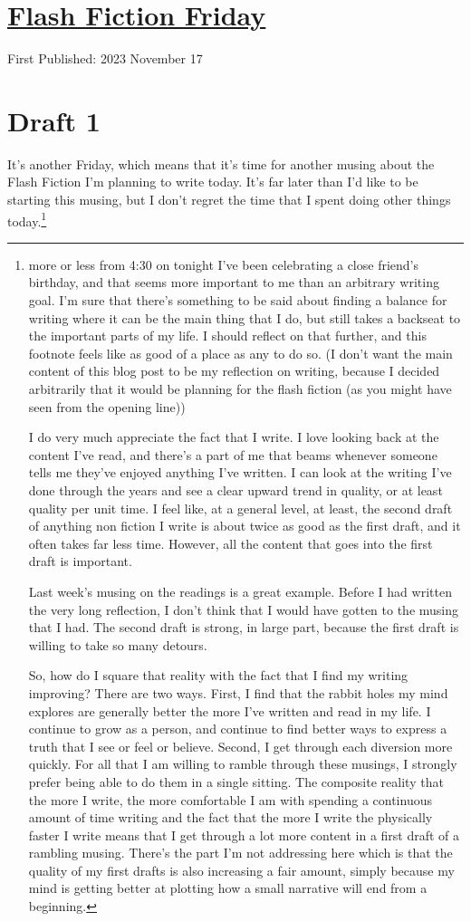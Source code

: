 \documentclass[12pt]{article}[titlepage]
\newcommand{\1}{\={a}}
\newcommand{\2}{\={e}}
\newcommand{\3}{\={\i}}
\newcommand{\4}{\=o}
\newcommand{\5}{\=u}
\newcommand{\6}{\={A}}
\renewcommand{\,}{\textsuperscript{,}}
\begin{document}
\doublespacing
\section{\href{flash-fiction-227.html}{Flash Fiction Friday}}
First Published: 2023 November 17

\section{Draft 1}
It's another Friday, which means that it's time for another musing about the Flash Fiction I'm planning to write today.
It's far later than I'd like to be starting this musing, but I don't regret the time that I spent doing other things today.\footnote{more or less from 4:30 on tonight I've been celebrating a close friend's birthday, and that seems more important to me than an arbitrary writing goal.
I'm sure that there's something to be said about finding a balance for writing where it can be the main thing that I do, but still takes a backseat to the important parts of my life.
I should reflect on that further, and this footnote feels like as good of a place as any to do so. (I don't want the main content of this blog post to be my reflection on writing, because I decided arbitrarily that it would be planning for the flash fiction (as you might have seen from the opening line))

I do very much appreciate the fact that I write.
I love looking back at the content I've read, and there's a part of me that beams whenever someone tells me they've enjoyed anything I've written.
I can look at the writing I've done through the years and see a clear upward trend in quality, or at least quality per unit time.
I feel like, at a general level, at least, the second draft of anything non fiction I write is about twice as good as the first draft, and it often takes far less time.
However, all the content that goes into the first draft is important.

Last week's musing on the readings is a great example.
Before I had written the very long reflection, I don't think that I would have gotten to the musing that I had.
The second draft is strong, in large part, because the first draft is willing to take so many detours.

So, how do I square that reality with the fact that I find my writing improving?
There are two ways.
First, I find that the rabbit holes my mind explores are generally better the more I've written and read in my life.
I continue to grow as a person, and continue to find better ways to express a truth that I see or feel or believe.
Second, I get through each diversion more quickly.
For all that I am willing to ramble through these musings, I strongly prefer being able to do them in a single sitting.
The composite reality that the more I write, the more comfortable I am with spending a continuous amount of time writing and the fact that the more I write the physically faster I write means that I get through a lot more content in a first draft of a rambling musing.
There's the part I'm not addressing here which is that the quality of my first drafts is also increasing a fair amount, simply because my mind is getting better at plotting how a small narrative will end from a beginning.

}
\end{document}
